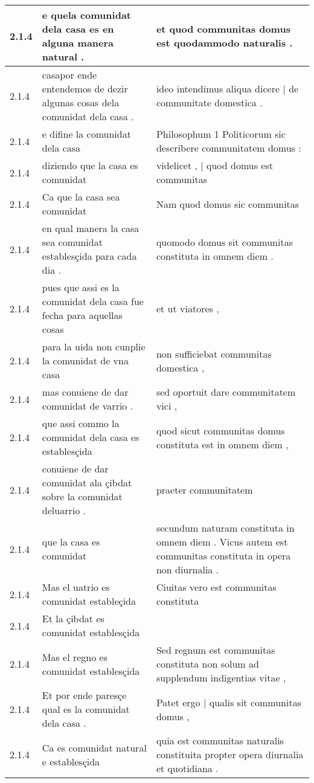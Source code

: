 \begin{tabular}{|p{1cm}|p{6.5cm}|p{6.5cm}|}
2.1.4 & e quela comunidat dela casa es en alguna manera natural . & et quod communitas domus est quodammodo naturalis . \\\hline
2.1.4 & casapor ende entendemos de dezir algunas cosas dela comunidat dela casa . & ideo intendimus aliqua dicere | de communitate domestica . \\\hline
2.1.4 & e difine la comunidat dela casa & Philosophum 1 Politicorum sic describere communitatem domus : \\\hline
2.1.4 & diziendo que la casa es comunidat & videlicet , | quod domus est communitas \\\hline
2.1.4 & Ca que la casa sea comunidat & Nam quod domus sic communitas \\\hline
2.1.4 & en qual manera la casa sea comunidat establesçida para cada dia . & quomodo domus sit communitas constituta in omnem diem . \\\hline
2.1.4 & pues que assi es la comunidat dela casa fue fecha para aquellas cosas & et ut viatores , \\\hline
2.1.4 & para la uida non cunplie la comunidat de vna casa & non sufficiebat communitas domestica , \\\hline
2.1.4 & mas conuiene de dar comunidat de varrio . & sed oportuit dare communitatem vici , \\\hline
2.1.4 & que assi commo la comunidat dela casa es establesçida & quod sicut communitas domus constituta est in omnem diem , \\\hline
2.1.4 & conuiene de dar comunidat ala çibdat sobre la comunidat deluarrio . & praeter communitatem \\\hline
2.1.4 & que la casa es comunidat & secundum naturam constituta in omnem diem . Vicus autem est communitas constituta in opera non diurnalia . \\\hline
2.1.4 & Mas el uatrio es comunidat estableçida & Ciuitas vero est communitas constituta \\\hline
2.1.4 & Et la çibdat es comunidat establesçida &  \\\hline
2.1.4 & Mas el regno es comunidat establesçida & Sed regnum est communitas constituta non solum ad supplendum indigentias vitae , \\\hline
2.1.4 & Et por ende paresçe qual es la comunidat dela casa . & Patet ergo | qualis sit communitas domus , \\\hline
2.1.4 & Ca es comunidat natural e establesçida & quia est communitas naturalis constituita propter opera diurnalia et quotidiana . \\\hline

\end{tabular}
